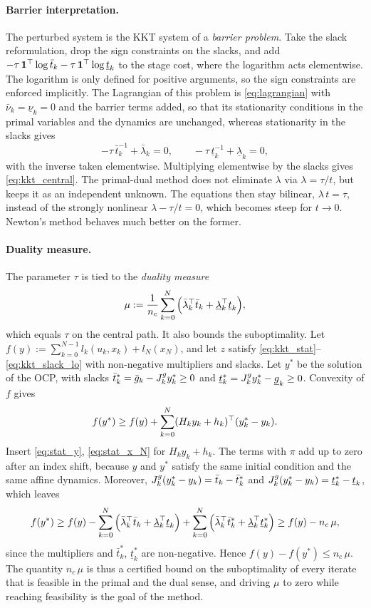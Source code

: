 \paragraph{Barrier interpretation.}
The perturbed system is the KKT system of a \textit{barrier problem}.
Take the slack reformulation, drop the sign constraints on the slacks, and add $-\tau\, \mathbf{1}^\top\log \bar{t}_k - \tau\, \mathbf{1}^\top\log \underline{t}_k$ to the stage cost, where the logarithm acts elementwise.
The logarithm is only defined for positive arguments, so the sign constraints are enforced implicitly.
The Lagrangian of this problem is \eqref{eq:lagrangian} with $\bar{\nu}_k = \underline{\nu}_k = 0$ and the barrier terms added, so that its stationarity conditions in the primal variables and the dynamics are unchanged, whereas stationarity in the slacks gives
\[
    -\tau\, \bar{t}_k^{-1} + \bar{\lambda}_k = 0, \qquad -\tau\, \underline{t}_k^{-1} + \underline{\lambda}_k = 0 ,
\]
with the inverse taken elementwise.
Multiplying elementwise by the slacks gives \eqref{eq:kkt_central}.
The primal-dual method does not eliminate $\lambda$ via $\lambda = \tau / t$, but keeps it as an independent unknown.
The equations then stay bilinear, $\lambda\, t = \tau$, instead of the strongly nonlinear $\lambda - \tau / t = 0$, which becomes steep for $t \to 0$.
Newton's method behaves much better on the former.

\paragraph{Duality measure.}
The parameter $\tau$ is tied to the \textit{duality measure}~\cite{wright1997primal}
\[
    \mu := \frac{1}{n_c}\sum_{k=0}^{N} \Big( \bar{\lambda}_k^\top \bar{t}_k + \underline{\lambda}_k^\top \underline{t}_k \Big) ,
\]
which equals $\tau$ on the central path.
It also bounds the suboptimality.
Let $f(y) := \sum_{k=0}^{N-1} l_k(u_k, x_k) + l_N(x_N)$, and let $z$ satisfy \eqref{eq:kkt_stat}--\eqref{eq:kkt_slack_lo} with non-negative multipliers and slacks.
Let $y^*$ be the solution of the OCP, with slacks $\bar{t}_k^* = \bar{g}_k - {J^{g}_{k}} y_k^* \geq 0$ and $\underline{t}_k^* = {J^{g}_{k}} y_k^* - \underline{g}_k \geq 0$.
Convexity of $f$ gives
\[
    f(y^*) \geq f(y) + \sum_{k=0}^{N} (H_k y_k + h_k)^\top (y_k^* - y_k) .
\]
Insert \eqref{eq:stat_y}, \eqref{eq:stat_x_N} for $H_k y_k + h_k$.
The terms with $\pi$ add up to zero after an index shift, because $y$ and $y^*$ satisfy the same initial condition and the same affine dynamics.
Moreover, ${J^{g}_{k}}(y_k^* - y_k) = \bar{t}_k - \bar{t}_k^*$ and ${J^{g}_{k}}(y_k^* - y_k) = \underline{t}_k^* - \underline{t}_k$, which leaves
\[
    f(y^*) \geq f(y) - \sum_{k=0}^{N}\Big( \bar{\lambda}_k^\top \bar{t}_k + \underline{\lambda}_k^\top \underline{t}_k \Big)
        + \sum_{k=0}^{N}\Big( \bar{\lambda}_k^\top \bar{t}_k^* + \underline{\lambda}_k^\top \underline{t}_k^* \Big)
    \geq f(y) - n_c\, \mu ,
\]
since the multipliers and $\bar{t}_k^*$, $\underline{t}_k^*$ are non-negative.
Hence $f(y) - f(y^*) \leq n_c\, \mu$.
The quantity $n_c\, \mu$ is thus a certified bound on the suboptimality of every iterate that is feasible in the primal and the dual sense, and driving $\mu$ to zero while reaching feasibility is the goal of the method.

